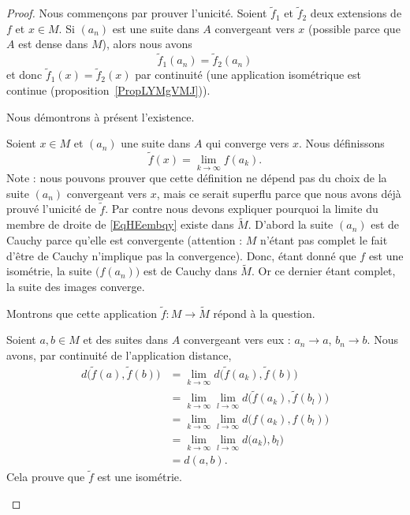 \begin{proof}
	Nous commençons par prouver l'unicité. Soient \( \tilde f_1\) et \( \tilde f_2\) deux extensions de \( f\) et \( x\in M\). Si \( (a_n)\) est une suite dans \( A\) convergeant vers \( x\) (possible parce que \( A\) est dense dans \( M\)), alors nous avons
	\begin{equation}
		\tilde f_1(a_n)=\tilde f_2(a_n)
	\end{equation}
	et donc \( \tilde f_1(x)=\tilde f_2(x)\) par continuité (une application isométrique est continue (proposition~\ref{PropLYMgVMJ})).

	Nous démontrons à présent l'existence.

	\begin{subproof}
		Soient \( x\in M\) et \( (a_n)\) une suite dans \( A\) qui converge vers \( x\). Nous définissons
		\begin{equation}    \label{EqHEembqy}
			\tilde f(x)=\lim_{k\to \infty} f(a_k).
		\end{equation}
		Note : nous pouvons prouver que cette définition ne dépend pas du choix de la suite \( (a_n)\) convergeant vers \( x\), mais ce serait superflu parce que nous avons déjà prouvé l'unicité de \( \tilde f\). Par contre nous devons expliquer pourquoi la limite du membre de droite de \eqref{EqHEembqy} existe dans \( \tilde M\). D'abord la suite \( (a_n)\) est de Cauchy parce qu'elle est convergente (attention : \( M\) n'étant pas complet le fait d'être de Cauchy n'implique pas la convergence). Donc, étant donné que \( f\) est une isométrie, la suite \( \big( f(a_n) \big)\) est de Cauchy dans \( \tilde M\). Or ce dernier étant complet, la suite des images converge.

		Montrons que cette application \( \tilde f\colon M\to \tilde M\) répond à la question.


		Soient \( a,b\in M\) et des suites dans \( A\) convergeant vers eux : \( a_n\to a\), \( b_n\to b\). Nous avons, par continuité de l'application distance,
		\begin{subequations}
			\begin{align}
				d\big( \tilde f(a),\tilde f(b) \big) & =\lim_{k\to \infty} d\big( \tilde f(a_k),\tilde f(b) \big)                      \\
				                                     & =\lim_{k\to \infty}\lim_{l\to \infty}  d\big( \tilde f(a_k),\tilde f(b_l) \big) \\
				                                     & =\lim_{k\to \infty}\lim_{l\to \infty}  d\big(  f(a_k), f(b_l) \big)             \\
				                                     & =\lim_{k\to \infty}\lim_{l\to \infty}  d\big( a_k),b_l\big)                     \\
				                                     & =d(a,b).
			\end{align}
		\end{subequations}
		Cela prouve que \( \tilde f\) est une isométrie.


\end{subproof}
\end{proof}
